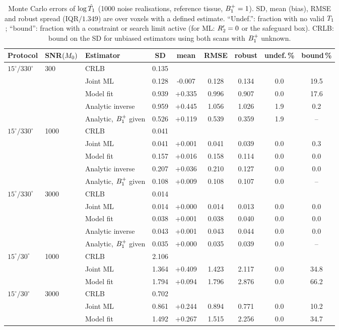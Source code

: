 \begin{table}[p]
\centering
\caption{Monte Carlo errors of $\log\hat{T_1}$ (1000 noise realisations, reference tissue, $B_1^{+}=1$). SD, mean (bias), RMSE and robust spread (IQR$/1.349$) are over voxels with a defined estimate. ``Undef.'': fraction with no valid $T_1$; ``bound'': fraction with a constraint or search limit active (for ML: $R_2'=0$ or the safeguard box). CRLB: bound on the SD for unbiased estimators using both scans with $B_1^{+}$ unknown.}
\label{tab:mc}
\small
\begin{tabular}{lllcccccc}
\toprule
Protocol & SNR$(M_0)$ & Estimator & SD & mean & RMSE & robust & undef.\,\% & bound\,\%\\
\midrule
$15^\circ/330^\circ$ & 300 & CRLB & 0.135 & & & & & \\
 & & Joint ML & 0.128 & -0.007 & 0.128 & 0.134 & 0.0 & 19.5\\
 & & Model fit & 0.939 & +0.335 & 0.996 & 0.907 & 0.0 & 17.6\\
 & & Analytic inverse & 0.959 & +0.445 & 1.056 & 1.026 & 1.9 & 0.2\\
 & & Analytic, $B_1^{+}$ given & 0.526 & +0.119 & 0.539 & 0.359 & 1.9 & --\\
\midrule
$15^\circ/330^\circ$ & 1000 & CRLB & 0.041 & & & & & \\
 & & Joint ML & 0.041 & +0.001 & 0.041 & 0.039 & 0.0 & 0.3\\
 & & Model fit & 0.157 & +0.016 & 0.158 & 0.114 & 0.0 & 0.0\\
 & & Analytic inverse & 0.207 & +0.036 & 0.210 & 0.127 & 0.0 & 0.0\\
 & & Analytic, $B_1^{+}$ given & 0.108 & +0.009 & 0.108 & 0.107 & 0.0 & --\\
\midrule
$15^\circ/330^\circ$ & 3000 & CRLB & 0.014 & & & & & \\
 & & Joint ML & 0.014 & +0.000 & 0.014 & 0.013 & 0.0 & 0.0\\
 & & Model fit & 0.038 & +0.001 & 0.038 & 0.040 & 0.0 & 0.0\\
 & & Analytic inverse & 0.043 & +0.001 & 0.043 & 0.044 & 0.0 & 0.0\\
 & & Analytic, $B_1^{+}$ given & 0.035 & +0.000 & 0.035 & 0.039 & 0.0 & --\\
\midrule
$15^\circ/30^\circ$ & 1000 & CRLB & 2.106 & & & & & \\
 & & Joint ML & 1.364 & +0.409 & 1.423 & 2.117 & 0.0 & 34.8\\
 & & Model fit & 1.794 & +0.094 & 1.796 & 2.876 & 0.0 & 66.2\\
\midrule
$15^\circ/30^\circ$ & 3000 & CRLB & 0.702 & & & & & \\
 & & Joint ML & 0.861 & +0.244 & 0.894 & 0.771 & 0.0 & 10.2\\
 & & Model fit & 1.492 & +0.267 & 1.515 & 2.256 & 0.0 & 34.7\\
\bottomrule
\end{tabular}
\end{table}

